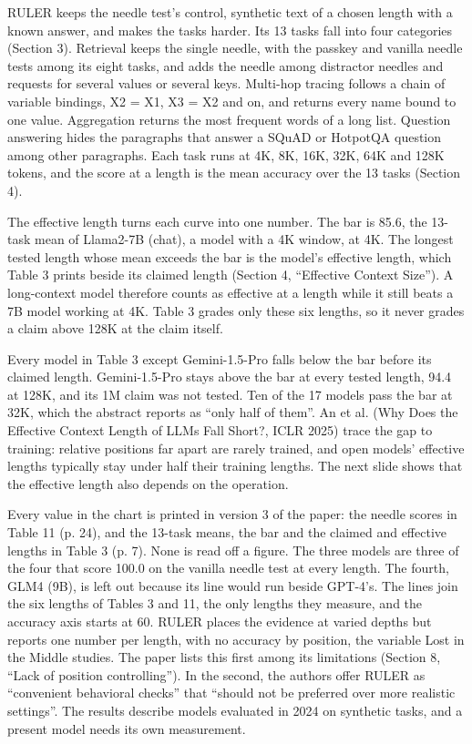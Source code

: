RULER keeps the needle test's control, synthetic text of a chosen length with a known answer, and makes the tasks harder. Its 13 tasks fall into four categories (Section 3). Retrieval keeps the single needle, with the passkey and vanilla needle tests among its eight tasks, and adds the needle among distractor needles and requests for several values or several keys. Multi-hop tracing follows a chain of variable bindings, X2 = X1, X3 = X2 and on, and returns every name bound to one value. Aggregation returns the most frequent words of a long list. Question answering hides the paragraphs that answer a SQuAD or HotpotQA question among other paragraphs. Each task runs at 4K, 8K, 16K, 32K, 64K and 128K tokens, and the score at a length is the mean accuracy over the 13 tasks (Section 4).

The effective length turns each curve into one number. The bar is 85.6, the 13-task mean of Llama2-7B (chat), a model with a 4K window, at 4K. The longest tested length whose mean exceeds the bar is the model's effective length, which Table 3 prints beside its claimed length (Section 4, ``Effective Context Size''). A long-context model therefore counts as effective at a length while it still beats a 7B model working at 4K. Table 3 grades only these six lengths, so it never grades a claim above 128K at the claim itself.

Every model in Table 3 except Gemini-1.5-Pro falls below the bar before its claimed length. Gemini-1.5-Pro stays above the bar at every tested length, 94.4 at 128K, and its 1M claim was not tested. Ten of the 17 models pass the bar at 32K, which the abstract reports as ``only half of them''. An et al. (Why Does the Effective Context Length of LLMs Fall Short?, ICLR 2025) trace the gap to training: relative positions far apart are rarely trained, and open models' effective lengths typically stay under half their training lengths. The next slide shows that the effective length also depends on the operation.

Every value in the chart is printed in version 3 of the paper: the needle scores in Table 11 (p. 24), and the 13-task means, the bar and the claimed and effective lengths in Table 3 (p. 7). None is read off a figure. The three models are three of the four that score 100.0 on the vanilla needle test at every length. The fourth, GLM4 (9B), is left out because its line would run beside GPT-4's. The lines join the six lengths of Tables 3 and 11, the only lengths they measure, and the accuracy axis starts at 60. RULER places the evidence at varied depths but reports one number per length, with no accuracy by position, the variable Lost in the Middle studies. The paper lists this first among its limitations (Section 8, ``Lack of position controlling''). In the second, the authors offer RULER as ``convenient behavioral checks'' that ``should not be preferred over more realistic settings''. The results describe models evaluated in 2024 on synthetic tasks, and a present model needs its own measurement.

